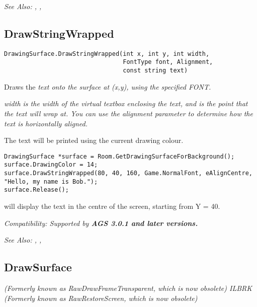 \it{See Also:} ,
,


\subsection{DrawStringWrapped}\label{DrawingSurface.DrawStringWrapped}%

\begin{verbatim}
DrawingSurface.DrawStringWrapped(int x, int y, int width,
                                 FontType font, Alignment,
                                 const string text)
\end{verbatim}
Draws the \it{text} onto the surface at (x,y), using the specified FONT.

\it{width} is the width of the virtual textbox enclosing the text, and is the point
that the text will wrap at. You can use the \it{alignment} parameter to determine
how the text is horizontally aligned.

The text will be printed using the current drawing colour.

\begin{verbatim}
DrawingSurface *surface = Room.GetDrawingSurfaceForBackground();
surface.DrawingColor = 14;
surface.DrawStringWrapped(80, 40, 160, Game.NormalFont, eAlignCentre, "Hello, my name is Bob.");
surface.Release();
\end{verbatim}
will display the text in the centre of the screen, starting from Y = 40.

\it{Compatibility:} Supported by \bf{AGS 3.0.1} and later versions.

\it{See Also:} ,
,


\subsection{DrawSurface}\label{DrawingSurface.DrawSurface}%

\it{(Formerly known as RawDrawFrameTransparent, which is now obsolete)} ILBRK
\it{(Formerly known as RawRestoreScreen, which is now obsolete)}

